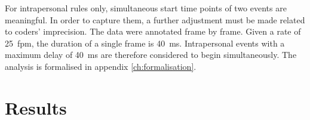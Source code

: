 For intrapersonal rules only, simultaneous start time points of two events are meaningful. In order to capture them, a further adjustment must be made related to coders' imprecision. The data were annotated frame by frame. Given a rate of 25~fpm, the duration of a single frame is 40~ms. Intrapersonal events with a maximum delay of 40~ms are therefore considered to begin simultaneously. The analysis is formalised in appendix \ref{ch:formalisation}.

\section{Results}



































